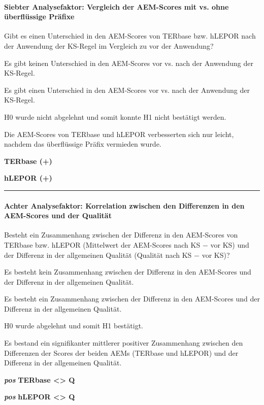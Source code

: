 \paragraph*{Siebter Analysefaktor: Vergleich der AEM-Scores mit vs. ohne überflüssige Präfixe}
\begin{description}[font=\normalfont\bfseries]
\item [Fragestellung:] Gibt es einen Unterschied in den AEM-Scores von TERbase bzw. hLEPOR nach der Anwendung der KS-Regel im Vergleich zu vor der Anwendung?
\item [H0 --] Es gibt keinen Unterschied in den AEM-Scores vor vs. nach der Anwendung der KS-Regel.
\item [H1 --] Es gibt einen Unterschied in den AEM-Scores vor vs. nach der Anwendung der KS-Regel.
\item [Resultat]
\end{description}
\noindent
\parbox[t]{.75\textwidth}{
H0 wurde nicht abgelehnt und somit konnte H1 nicht bestätigt werden.

Die AEM-Scores von TERbase und hLEPOR verbesserten sich nur leicht, nachdem das überflüssige Präfix vermieden wurde.
}
\parbox[t]{.04\textwidth}{}
\parbox[t]{.2\textwidth}{
{ \textbf{TERbase (+)}}

 \textbf{hLEPOR (+)}
}
\smallskip
\hrule
\paragraph*{Achter Analysefaktor: Korrelation zwischen den Differenzen in den AEM-Scores und der Qualität}
\begin{description}[font=\normalfont\bfseries]
\item [Fragestellung:] Besteht ein Zusammenhang zwischen der Differenz in den AEM-Scores von TERbase bzw. hLEPOR (Mittelwert der AEM-Scores nach KS $-$ vor KS) und der Differenz in der allgemeinen Qualität (Qualität nach KS $-$ vor KS)?
\item [H0 --] Es besteht kein Zusammenhang zwischen der Differenz in den AEM-Scores und der Differenz in der allgemeinen Qualität.
\item [H1 --] Es besteht ein Zusammenhang zwischen der Differenz in den AEM-Scores und der Differenz in der allgemeinen Qualität.
\item [Resultat]
\end{description}
\noindent
\parbox[t]{.7\textwidth}{
H0 wurde abgelehnt und somit H1 bestätigt.

Es bestand ein signifikanter mittlerer positiver Zusammenhang zwischen den Differenzen der Scores der beiden AEMs (TERbase und hLEPOR) und der Differenz in der allgemeinen Qualität.
}
\parbox[t]{.04\textwidth}{}
\colorbox{smGreen}{\parbox[t]{.25\textwidth}{
{ \textbf{\textit{pos}} \textbf{TERbase <> Q}}

 \textbf{\textit{pos}} \textbf{hLEPOR <> Q}\\
 \\
 \\
}}


